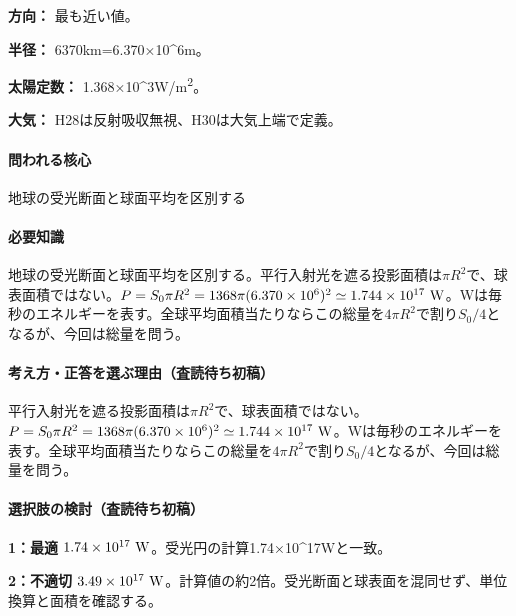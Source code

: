 \noindent\textbf{方向：} 最も近い値。\par

\noindent\textbf{半径：} 6370km=\allowbreak{}6.370×10\textasciicircum{}6m。\par

\noindent\textbf{太陽定数：} 1.368×10\textasciicircum{}3W/m\textsuperscript{2}。\par

\noindent\textbf{大気：} H28は反射吸収無視、H30は大気上端で定義。\par

\paragraph{問われる核心} 地球の受光断面と球面平均を区別する

\paragraph{必要知識} 地球の受光断面と球面平均を区別する。平行入射光を遮る投影面積は\(\pi R^2\)で、球表面積ではない。\(P=S_0\pi R^2=1368\pi(6.370\times10^6)^2\simeq1.744\times10^{17}\ {\rm W}\)。Wは毎秒のエネルギーを表す。全球平均面積当たりならこの総量を\(4\pi R^2\)で割り\(S_0/4\)となるが、今回は総量を問う。

\paragraph{考え方・正答を選ぶ理由（査読待ち初稿）} 平行入射光を遮る投影面積は\(\pi R^2\)で、球表面積ではない。\(P=S_0\pi R^2=1368\pi(6.370\times10^6)^2\simeq1.744\times10^{17}\ {\rm W}\)。Wは毎秒のエネルギーを表す。全球平均面積当たりならこの総量を\(4\pi R^2\)で割り\(S_0/4\)となるが、今回は総量を問う。

\paragraph{選択肢の検討（査読待ち初稿）}\mbox{}\par

\noindent\textbf{1：最適} \(1.74\times10^{17}\ {\rm W}\)。受光円の計算1.74×10\textasciicircum{}17Wと一致。\par

\noindent\textbf{2：不適切} \(3.49\times10^{17}\ {\rm W}\)。計算値の約2倍。受光断面と球表面を混同せず、単位換算と面積を確認する。\par

